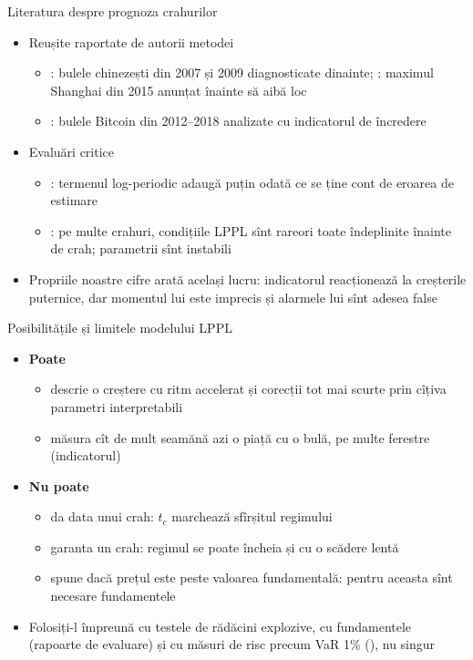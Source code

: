 \begin{frame}{Literatura despre prognoza crahurilor}
\itemsize{\small}
\begin{itemize}
    \item Reușite raportate de autorii metodei
    \begin{itemize}
        \item {}: bulele chinezești din 2007 și 2009 diagnosticate dinainte; : maximul Shanghai din 2015 anunțat înainte să aibă loc
        \item {}: bulele Bitcoin din 2012--2018 analizate cu indicatorul de încredere
    \end{itemize}
    \item Evaluări critice
    \begin{itemize}
        \item {}: termenul log-periodic adaugă puțin odată ce se ține cont de eroarea de estimare
        \item {}: pe multe crahuri, condițiile LPPL sînt rareori toate îndeplinite înainte de crah; parametrii sînt instabili
    \end{itemize}
    \item Propriile noastre cifre arată același lucru: indicatorul reacționează la creșterile puternice, dar momentul lui este imprecis și alarmele lui sînt adesea false
\end{itemize}
\end{frame}

\begin{frame}{Posibilitățile și limitele modelului LPPL}
\itemsize{\small}
\begin{itemize}
    \item \textbf{Poate}
    \begin{itemize}
        \item descrie o creștere cu ritm accelerat și corecții tot mai scurte prin cîțiva parametri interpretabili
        \item măsura cît de mult seamănă azi o piață cu o bulă, pe multe ferestre (indicatorul)
    \end{itemize}
    \item \textbf{Nu poate}
    \begin{itemize}
        \item da data unui crah: $t_c$ marchează sfîrșitul regimului
        \item garanta un crah: regimul se poate încheia și cu o scădere lentă
        \item spune dacă prețul este peste valoarea fundamentală: pentru aceasta sînt necesare fundamentele
    \end{itemize}
    \item Folosiți-l împreună cu testele de rădăcini explozive, cu fundamentele (rapoarte de evaluare) și cu măsuri de risc precum VaR 1\% (), nu singur
\end{itemize}
\end{frame}

